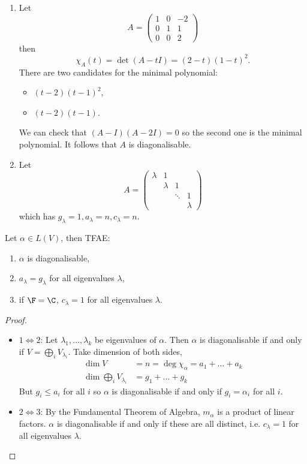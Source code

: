 \documentclass[a4paper]{article}
\theoremstyle{definition}
\begin{document}
\begin{eg}\leavevmode
  \begin{enumerate}
  \item Let
  \[
    A =
    \begin{pmatrix}
      1 & 0 & -2 \\
      0 & 1 & 1 \\
      0 & 0 & 2
    \end{pmatrix}
  \]
  then
  \[
    \chi_A(t) = \det(A - tI) = (2 - t)(1 - t)^2.
  \]
  There are two candidates for the minimal polynomial:
  \begin{itemize}
  \item \((t - 2)(t - 1)^2\),
  \item \((t - 2)(t - 1)\).
  \end{itemize}
  We can check that \((A - I)(A - 2I) = 0\) so the second one is the minimal polynomial. It follows that \(A\) is diagonalisable.
\item Let
  \[
    A =
    \begin{pmatrix}
      \lambda & 1 & & \\
      & \lambda & 1 &  \\
      & & \ddots & 1 \\
      & & & \lambda
    \end{pmatrix}
  \]
  which has \(g_\lambda = 1, a_\lambda = n, c_\lambda = n\).
  \end{enumerate}
\end{eg}

\begin{lemma}
  Let \(\alpha \in L(V)\), then TFAE:
  \begin{enumerate}
  \item \(\alpha\) is diagonalisable,
  \item \(a_\lambda = g_\lambda\) for all eigenvalues \(\lambda\),
  \item if \(\F = \C\), \(c_\lambda = 1\) for all eigenvalues \(\lambda\).
  \end{enumerate}
\end{lemma}

\begin{proof}\leavevmode
  \begin{itemize}
  \item \(1 \Leftrightarrow 2\): Let \(\lambda_1, \dots, \lambda_k\) be eigenvalues of \(\alpha\). Then \(\alpha\) is diagonalisable if and only if \(V = \bigoplus_i V_{\lambda_i}\). Take dimension of both sides,
    \begin{align*}
      \dim V &= n = \deg \chi_\alpha = a_1 + \dots + a_k \\
      \dim \bigoplus_i V_{\lambda_i} &= g_1 + \dots + g_k
    \end{align*}
    But \(g_i \leq a_i\) for all \(i\) so \(\alpha\) is diagonalisable if and only if \(g_i = \alpha_i\) for all \(i\).
  \item \(2 \Leftrightarrow 3\): By the Fundamental Theorem of Algebra, \(m_\alpha\) is a product of linear factors. \(\alpha\) is diagonalisable if and only if these are all distinct, i.e. \(c_\lambda = 1\) for all eigenvalues \(\lambda\).
  \end{itemize}
\end{proof}
\end{document}
